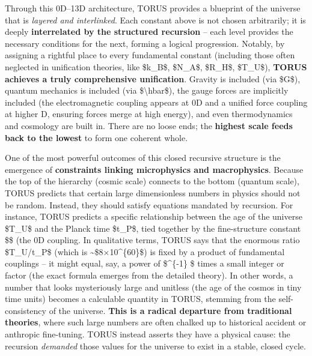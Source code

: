 \documentclass[
]{article}
\begin{document}
Through this 0D--13D architecture, TORUS provides a blueprint of the
universe that is \emph{layered and interlinked}. Each constant above is
not chosen arbitrarily; it is deeply \textbf{interrelated by the
structured recursion} -- each level provides the necessary conditions
for the next, forming a logical progression. Notably, by assigning a
rightful place to every fundamental constant (including those often
neglected in unification theories, like \$k\_B\$, \$N\_A\$, \$R\_H\$,
\$T\_U\$), \textbf{TORUS achieves a truly comprehensive
unification}\hspace{0pt}. Gravity is included (via \$G\$), quantum
mechanics is included (via \$\textbackslash hbar\$), the gauge forces
are implicitly included (the electromagnetic coupling appears at 0D and
a unified force coupling at higher D, ensuring forces merge at high
energy), and even thermodynamics and cosmology are built in. There are
no loose ends; the \textbf{highest scale feeds back to the lowest} to
form one coherent whole\hspace{0pt}.

One of the most powerful outcomes of this closed recursive structure is
the emergence of \textbf{constraints linking microphysics and
macrophysics}. Because the top of the hierarchy (cosmic scale) connects
to the bottom (quantum scale), TORUS predicts that certain large
dimensionless numbers in physics should not be random. Instead, they
should satisfy equations mandated by recursion. For instance, TORUS
predicts a specific relationship between the age of the universe
\$T\_U\$ and the Planck time \$t\_P\$, tied together by the
fine-structure constant \$\alpha\$ (the 0D coupling. In qualitative terms,
TORUS says that the enormous ratio \$T\_U/t\_P\$ (which is
\textasciitilde\$8×10\^{}\{60\}\$) is fixed by a product of fundamental
couplings -- it might equal, say, a power of \$\alpha\^{}\{-1\} \$ times
a small integer or factor (the exact formula emerges from the detailed
theory). In other words, a number that looks mysteriously large and
unitless (the age of the cosmos in tiny time units) becomes a calculable
quantity in TORUS, stemming from the self-consistency of the universe.
\textbf{This is a radical departure from traditional theories}, where
such large numbers are often chalked up to historical accident or
anthropic fine-tuning. TORUS instead asserts they have a physical cause:
the recursion \emph{demanded} those values for the universe to exist in
a stable, closed cycle\hspace{0pt}.
\end{document}
